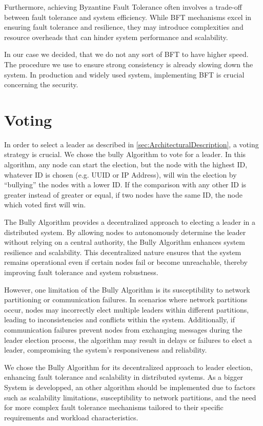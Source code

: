 Furthermore, achieving Byzantine Fault Tolerance often involves a trade-off between fault tolerance and system efficiency. While BFT mechanisms excel in ensuring fault tolerance and resilience, they may introduce complexities and resource overheads that can hinder system performance and scalability.

In our case we decided, that we do not any sort of \ac{BFT} to have higher speed. The procedure we use to ensure strong consistency is already slowing down the system. In production and widely used system, implementing \ac{BFT} is crucial concerning the security.
\section{Voting}\label{sec:Voting}
In order to select a leader as described in \ref{sec:ArchitecturalDescription}, a voting strategy is crucial. We chose the bully Algorithm to vote for a leader. In this algorithm, any node can start the election, but the node with the highest ID, whatever ID is chosen (e.g. \ac{UUID} or IP Address), will win 
the election by \enquote{bullying} the nodes with a lower ID. If the comparison with any other ID is greater instead of greater or equal, if two nodes have the same ID, the node which voted first will win.

The Bully Algorithm provides a decentralized approach to electing a leader in a distributed system. By allowing nodes to autonomously determine the leader without relying on a central authority, the Bully Algorithm enhances system resilience and scalability. This decentralized nature ensures that the system remains operational even if certain nodes fail or become unreachable, thereby improving fault tolerance and system robustness.

However, one limitation of the Bully Algorithm is its susceptibility to network partitioning or communication failures. In scenarios where network partitions occur, nodes may incorrectly elect multiple leaders within different partitions, leading to inconsistencies and conflicts within the system. Additionally, if communication failures prevent nodes from exchanging messages during the leader election process, the algorithm may result in delays or failures to elect a leader, compromising the system's responsiveness and reliability.

We chose the Bully Algorithm for its decentralized approach to leader election, enhancing fault tolerance and scalability in distributed systems. As a bigger System is developped, an other algorithm should be implemented due to factors such as scalability limitations, susceptibility to network partitions, and the need for more complex fault tolerance mechanisms tailored to their specific requirements and workload characteristics.


